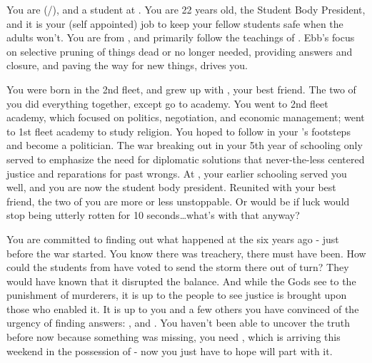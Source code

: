 \documentclass[char]{GL2020}
\begin{document}
\name{\cPresident{}}

You are \cPresident{} (\cPresident{\they}/\cPresident{\them}), and a student at \pSchool{}. You are 22 years old, the Student Body President, and it is your (self appointed) job to keep your fellow students safe when the adults won't. You are from \pShip{}, and primarily follow the teachings of \cEbb{\full}. Ebb's focus on selective pruning of things dead or no longer needed, providing answers and closure, and paving the way for new things, drives you.


You were born in the 2nd fleet, and grew up with \cInitiate{}, your best friend. The two of you did everything together, except go to academy. You went to 2nd fleet academy, which focused on politics, negotiation, and economic management; \cInitiate{\they} went to 1st fleet academy to study religion. You hoped to follow in your \cHeadDiplomat{\auncle}'s footsteps and become a politician. The war breaking out in your 5th year of schooling only served to emphasize the need for diplomatic solutions that never-the-less centered justice and reparations for past wrongs. At \pSchool{}, your earlier schooling served you well, and you are now the student body president. Reunited with your best friend, \cInitiate{} the two of you are more or less unstoppable. Or would be if \cInitiate{\their} luck would stop being utterly rotten for 10 seconds\ldots what's with that anyway?

You are committed to finding out what happened at the \pSc{} six years ago - just before the war started. You know there was treachery, there must have been. How could the students from \pShip{} have voted to send the storm there out of turn? They would have known that it disrupted the balance. And while the Gods see to the punishment of murderers, it is up to the people to see justice is brought upon those who enabled it. It is up to you and a few others you have convinced of the urgency of finding answers: \cLibAssist{}, and \cHeir{}. You haven't been able to uncover the truth before now because something was missing, you need \iMirror{}, which is arriving this weekend in the possession of \cDiplomat{} - now you just have to hope \cDiplomat{\they} will part with it.
\end{document}
